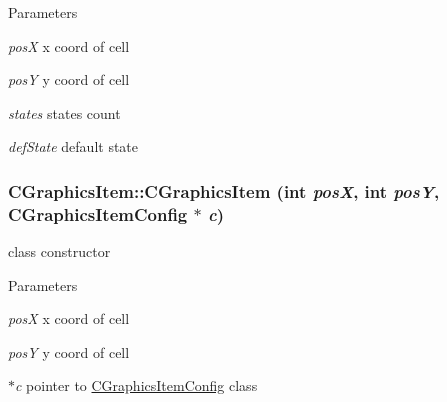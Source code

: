 \begin{DoxyParams}{Parameters}
\item[{\em posX}]x coord of cell \item[{\em posY}]y coord of cell \item[{\em states}]states count \item[{\em defState}]default state \end{DoxyParams}
\hypertarget{classCGraphicsItem_aaf9e5d412117ffdbe047ab45ba4f32b4}{
\subsubsection[{CGraphicsItem}]{\setlength{\rightskip}{0pt plus 5cm}CGraphicsItem::CGraphicsItem (int {\em posX}, \/  int {\em posY}, \/  {\bf CGraphicsItemConfig} $\ast$ {\em c})}}
\label{classCGraphicsItem_aaf9e5d412117ffdbe047ab45ba4f32b4}
class constructor


\begin{DoxyParams}{Parameters}
\item[{\em posX}]x coord of cell \item[{\em posY}]y coord of cell \item[{\em $\ast$c}]pointer to \hyperlink{classCGraphicsItemConfig}{CGraphicsItemConfig} class \end{DoxyParams}


